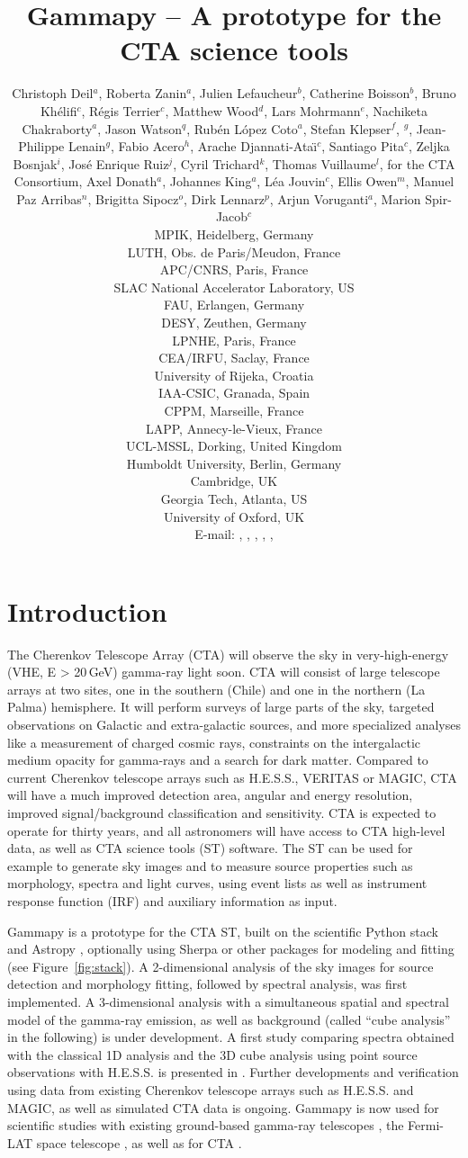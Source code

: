 \documentclass{PoS}
\title{Gammapy -- A prototype for the CTA science tools}
\author{
Christoph Deil$^a$,
Roberta Zanin$^a$,
Julien Lefaucheur$^b$,
Catherine Boisson$^b$,
Bruno Kh\'elifi$^c$,
R\'egis Terrier$^c$,
Matthew Wood$^d$,
Lars Mohrmann$^e$,
Nachiketa Chakraborty$^a$,
Jason Watson$^q$,
Rub\'en L\'opez Coto$^a$,
Stefan Klepser$^f$,
\speaker{Matteo Cerruti}$^g$,
Jean-Philippe Lenain$^g$,
Fabio Acero$^h$,
Arache Djannati-Ata{\"\i}$^c$,
Santiago Pita$^c$,
Zeljka Bosnjak$^i$,
Jos\'e Enrique Ruiz$^j$,
Cyril Trichard$^k$,
Thomas Vuillaume$^l$,
for the CTA Consortium,
Axel Donath$^a$,
Johannes King$^a$,
L\'ea Jouvin$^c$,
Ellis Owen$^m$,
Manuel Paz Arribas$^n$,
Brigitta Sipocz$^o$,
Dirk Lennarz$^p$,
Arjun Voruganti$^a$,
Marion Spir-Jacob$^c$
\\
\llap{$^a$}MPIK, Heidelberg, Germany\\
\llap{$^b$}LUTH, Obs. de Paris/Meudon, France\\
\llap{$^c$}APC/CNRS, Paris, France\\
\llap{$^d$}SLAC National Accelerator Laboratory, US\\
\llap{$^e$}FAU, Erlangen, Germany\\
\llap{$^f$}DESY, Zeuthen, Germany\\
\llap{$^g$}LPNHE, Paris, France\\
\llap{$^h$}CEA/IRFU, Saclay, France\\
\llap{$^i$}University of Rijeka, Croatia\\
\llap{$^j$}IAA-CSIC, Granada, Spain\\
\llap{$^k$}CPPM, Marseille, France\\
\llap{$^l$}LAPP, Annecy-le-Vieux, France\\
\llap{$^m$}UCL-MSSL, Dorking, United Kingdom\\
\llap{$^n$}Humboldt University, Berlin, Germany\\
\llap{$^o$}Cambridge, UK\\
\llap{$^p$}Georgia Tech, Atlanta, US\\
\llap{$^q$}University of Oxford, UK\\
E-mail:
\email{Christoph.Deil@mpi-hd.mpg.de},
\email{Roberta.Zanin@mpi-hd.mpg.de},
\email{julien.lefaucheur@obspm.fr},
\email{catherine.boisson@obspm.fr},
\email{khelifi@apc.in2p3.fr},
}
\begin{document}
\section{Introduction}
\label{sec:intro}

The Cherenkov Telescope Array (CTA) will observe the sky in very-high-energy
(VHE, E > 20$\,$GeV) gamma-ray light soon. CTA will consist of large telescope
arrays at two sites, one in the southern (Chile) and one in the northern (La
Palma) hemisphere. It will perform surveys of large parts of the sky, targeted
observations on Galactic and extra-galactic sources, and more specialized
analyses like a measurement of charged cosmic rays, constraints on the
intergalactic medium opacity for gamma-rays and a search for dark matter.
Compared to current Cherenkov telescope arrays such as H.E.S.S., VERITAS or
MAGIC, CTA will have a much improved detection area, angular and energy
resolution, improved signal/background classification and sensitivity. CTA is
expected to operate for thirty years, and all astronomers will have access to
CTA high-level data, as well as CTA science tools (ST) software. The ST can be
used for example to generate sky images and to measure source properties such as
morphology, spectra and light curves, using event lists as well as instrument
response function (IRF) and auxiliary information as input. 

Gammapy is a prototype for the CTA ST, built on the scientific Python stack and
Astropy \cite{astropy}, optionally using Sherpa \cite{sherpa2001, sherpa2009,
sherpa2011} or other packages for modeling and fitting (see
Figure~\ref{fig:stack}). A 2\hbox{-}dimensional analysis of the sky images for
source detection and morphology fitting, followed by spectral analysis, was
first  implemented. A 3\hbox{-}dimensional analysis with a simultaneous spatial
and spectral model of the gamma-ray emission, as well as background (called
``cube analysis'' in the following) is under development.
A first study comparing spectra obtained with the classical 1D analysis and the
3D cube analysis using point source observations with H.E.S.S. is presented in
\cite{lea}. Further developments and verification using data from existing
Cherenkov telescope arrays such as H.E.S.S. and MAGIC, as well as simulated CTA
data is ongoing.
Gammapy is now used for scientific studies with existing ground-based gamma-ray
telescopes \cite{hgps, shells}, the Fermi-LAT space telescope \cite{owen2015},
as well as for CTA \cite{julien, roberta, cyril}.
\end{document}
